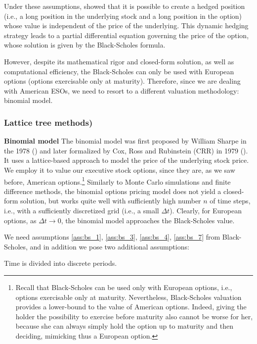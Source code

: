     Under these assumptions, \cite{black1973pricing} showed that it is possible to create a hedged position (i.e., a long position in the underlying stock and a long position in the option) whose value is independent of the price of the underlying. This dynamic hedging strategy leads to a partial differential equation governing the price of the option, whose solution is given by the Black-Scholes formula.

    However, despite its mathematical rigor and closed-form solution, as well as computational efficiency, the Black-Scholes can only be used with European options (options exercisable only at maturity). Therefore, since we are dealing with American ESOs, we need to resort to a different valuation methodology: binomial model.

\subsubsection*{Lattice tree methods)} 
\textbf{Binomial model}
The binomial model was first proposed by William Sharpe in the 1978 (\cite{sharpe1978investments}) and later formalized by Cox, Ross and Rubinstein (CRR) in 1979 (\cite{cox1979option}). It uses a lattice-based approach to model the price of the underlying stock price. We employ it to value our executive stock options, since they are, as we saw before, American options.\footnote{Recall that Black-Scholes can be used only with European options, i.e., options exercisable only at maturity. Nevertheless, Black-Scholes valuation provides a lower-bound to the value of American options. Indeed, giving the holder the possibility to exercise before maturity also cannot be worse for her, because she can always simply hold the option up to maturity and then deciding, mimicking thus a European option.}
Similarly to Monte Carlo simulations and finite difference methods, the binomial options pricing model does not yield a closed-form solution, but works quite well with sufficiently high number $n$ of time steps, i.e., with a sufficiently discretized grid (i.e., a small $\Delta t$). Clearly, for European options, as $\Delta t \rightarrow 0$, the binomial model approaches the Black-Scholes value.

We need assumptions \ref*{ass:bs_1}, \ref*{ass:bs_3}, \ref*{ass:bs_4}, \ref*{ass:bs_7} from Black-Scholes, and in addition we pose two additional assumptions:

\begin{assumption}
    \label{ass:bin_8}
    Time is divided into discrete periods.
\end{assumption}

